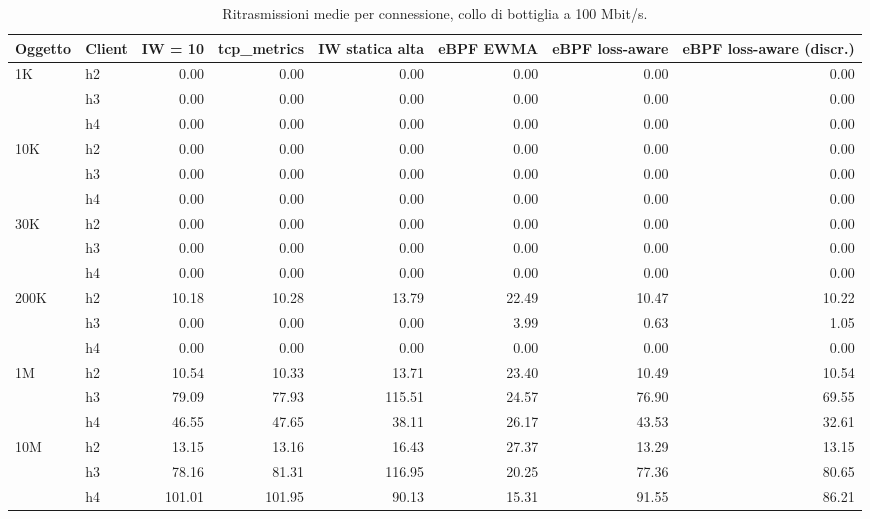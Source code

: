 \begin{table}[htbp]
  \centering
  \caption{Ritrasmissioni medie per connessione, collo di bottiglia a 100 Mbit/s.}
  \label{tab:retrans-100}
  \begin{tabular}{llrrrrrr}
    \toprule
    Oggetto & Client & IW = 10 & tcp\_metrics & IW statica alta & eBPF EWMA & eBPF loss-aware & eBPF loss-aware (discr.) \\
    \midrule
    1K & h2 & 0.00 & 0.00 & 0.00 & 0.00 & 0.00 & 0.00 \\
     & h3 & 0.00 & 0.00 & 0.00 & 0.00 & 0.00 & 0.00 \\
     & h4 & 0.00 & 0.00 & 0.00 & 0.00 & 0.00 & 0.00 \\
    \addlinespace
    10K & h2 & 0.00 & 0.00 & 0.00 & 0.00 & 0.00 & 0.00 \\
     & h3 & 0.00 & 0.00 & 0.00 & 0.00 & 0.00 & 0.00 \\
     & h4 & 0.00 & 0.00 & 0.00 & 0.00 & 0.00 & 0.00 \\
    \addlinespace
    30K & h2 & 0.00 & 0.00 & 0.00 & 0.00 & 0.00 & 0.00 \\
     & h3 & 0.00 & 0.00 & 0.00 & 0.00 & 0.00 & 0.00 \\
     & h4 & 0.00 & 0.00 & 0.00 & 0.00 & 0.00 & 0.00 \\
    \addlinespace
    200K & h2 & 10.18 & 10.28 & 13.79 & 22.49 & 10.47 & 10.22 \\
     & h3 & 0.00 & 0.00 & 0.00 & 3.99 & 0.63 & 1.05 \\
     & h4 & 0.00 & 0.00 & 0.00 & 0.00 & 0.00 & 0.00 \\
    \addlinespace
    1M & h2 & 10.54 & 10.33 & 13.71 & 23.40 & 10.49 & 10.54 \\
     & h3 & 79.09 & 77.93 & 115.51 & 24.57 & 76.90 & 69.55 \\
     & h4 & 46.55 & 47.65 & 38.11 & 26.17 & 43.53 & 32.61 \\
    \addlinespace
    10M & h2 & 13.15 & 13.16 & 16.43 & 27.37 & 13.29 & 13.15 \\
     & h3 & 78.16 & 81.31 & 116.95 & 20.25 & 77.36 & 80.65 \\
     & h4 & 101.01 & 101.95 & 90.13 & 15.31 & 91.55 & 86.21 \\
    \bottomrule
  \end{tabular}
\end{table}
